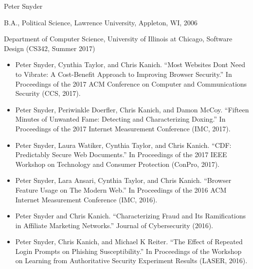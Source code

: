 \vita
\begin{singlespace}
\begin{description}[labelwidth=4cm,leftmargin=4.2cm,itemsep=1em]
    \item[NAME] Peter Snyder

    \item[EDUCATION] B.A., Political Science, Lawrence University, Appleton, WI, 2006

    \item[TEACHING] Department of Computer Science, University of Illinois at Chicago, Software Design (CS342, Summer 2017)

    \item[PUBLICATIONS] \begin{itemize}[label={},listparindent=0pt,itemindent=0pt,leftmargin=0pt,itemsep=1em,parsep=0pt,topsep=0pt,partopsep=0pt]
        \item Peter Snyder, Cynthia Taylor, and Chris Kanich. %
          ``Most Websites Dont Need to Vibrate: A Cost-Benefit Approach to Improving Browser Security.'' %
          In Proceedings of the 2017 ACM Conference on Computer and Communications Security (CCS, 2017).

        \item Peter Snyder, Periwinkle Doerfler, Chris Kanich, and Damon McCoy. %
        ``Fifteen Minutes of Unwanted Fame: Detecting and Characterizing Doxing.'' %
        In Proceedings of the 2017 Internet Measurement Conference (IMC, 2017).

        \item Peter Snyder, Laura Watiker, Cynthia Taylor, and Chris Kanich. %
        ``CDF: Predictably Secure Web Documents.'' %
        In Proceedings of the 2017 IEEE Workshop on Technology and Consumer Protection (ConPro, 2017).

        \item Peter Snyder, Lara Ansari, Cynthia Taylor, and Chris Kanich. %
        ``Browser Feature Usage on The Modern Web.'' %
        In Proceedings of the 2016 ACM Internet Measurement Conference (IMC, 2016).

        \item Peter Snyder and Chris Kanich. %
        ``Characterizing  Fraud  and  Its  Ramifications  in  Affiliate  Marketing  Networks.'' %
        Journal of Cybersecurity (2016).

        \item Peter Snyder, Chris Kanich, and Michael K Reiter. %
        ``The Effect of Repeated Login Prompts on Phishing Susceptibility.'' %
        In Proceedings of the Workshop on Learning from Authoritative Security Experiment Results (LASER, 2016).


\end{itemize}
\end{description}
\end{singlespace}
